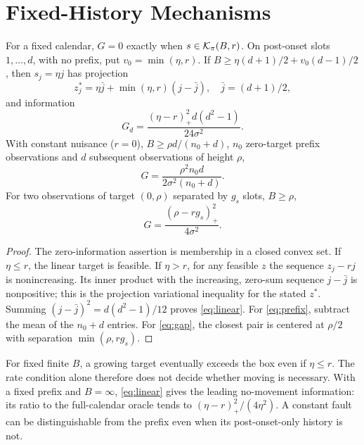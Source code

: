\section{Fixed-History Mechanisms}
\begin{proposition}\label{prop:history}
For a fixed calendar, $G=0$ exactly when $s\in\mathcal K_\pi(B,r)$. On post-onset slots $1,\ldots,d$, with no prefix, put $v_0=\min(\eta,r)$. If $B\ge\eta(d+1)/2+v_0(d-1)/2$, then $s_j=\eta j$ has projection
\begin{equation}
 z_j^*=\eta\bar j+\min(\eta,r)(j-\bar j),\quad\bar j=(d+1)/2,
\end{equation}
and information
\begin{equation}
 G_d=\frac{(\eta-r)_+^2d(d^2-1)}{24\sigma^2}.\label{eq:linear}
\end{equation}
With constant nuisance ($r=0$), $B\ge\rho d/(n_0+d)$, $n_0$ zero-target prefix observations and $d$ subsequent observations of height $\rho$,
\begin{equation}
 G=\frac{\rho^2n_0d}{2\sigma^2(n_0+d)}.\label{eq:prefix}
\end{equation}
For two observations of target $(0,\rho)$ separated by $g_s$ slots, $B\ge\rho$,
\begin{equation}
 G=\frac{(\rho-rg_s)_+^2}{4\sigma^2}.\label{eq:gap}
\end{equation}
\end{proposition}
\begin{proof}
The zero-information assertion is membership in a closed convex set. If $\eta\le r$, the linear target is feasible. If $\eta>r$, for any feasible $z$ the sequence $z_j-rj$ is nonincreasing. Its inner product with the increasing, zero-sum sequence $j-\bar j$ is nonpositive; this is the projection variational inequality for the stated $z^*$. Summing $(j-\bar j)^2=d(d^2-1)/12$ proves \eqref{eq:linear}. For \eqref{eq:prefix}, subtract the mean of the $n_0+d$ entries. For \eqref{eq:gap}, the closest pair is centered at $\rho/2$ with separation $\min(\rho,rg_s)$.\end{proof}

For fixed finite $B$, a growing target eventually exceeds the box even if $\eta\le r$. The rate condition alone therefore does not decide whether moving is necessary. With a fixed prefix and $B=\infty$, \eqref{eq:linear} gives the leading no-movement information: its ratio to the full-calendar oracle tends to $(\eta-r)_+^2/(4\eta^2)$. A constant fault can be distinguishable from the prefix even when its post-onset-only history is not.

